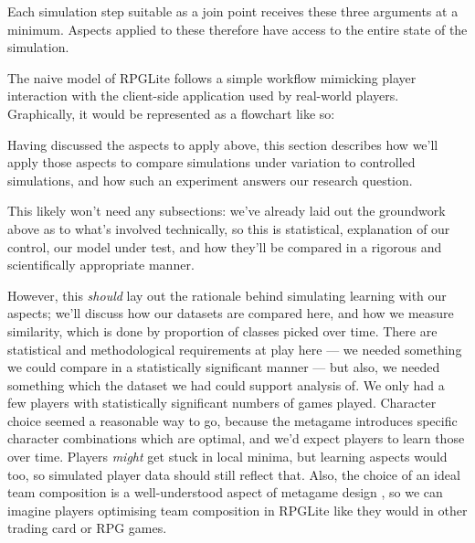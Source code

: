 Each simulation step suitable as a join point receives these three arguments at
a minimum. Aspects applied to these therefore have access to the entire state of
the simulation.

The naive model of RPGLite follows a simple workflow mimicking player
interaction with the client-side application used by real-world players.
Graphically, it would be represented as a flowchart like so:





Having discussed the aspects to apply above, this section describes how we'll
apply those aspects to compare simulations under variation to controlled
simulations, and how such an experiment answers our research question.

This likely won't need any subsections: we've already laid out the groundwork
above as to what's involved technically, so this is statistical, explanation of
our control, our model under test, and how they'll be compared in a rigorous and
scientifically appropriate manner.

However, this \emph{should} lay out the rationale behind simulating learning
with our aspects; we'll discuss how our datasets are compared here, and how we
measure similarity, which is done by proportion of classes picked over time.
There are statistical and methodological requirements at play here --- we needed
something we could compare in a statistically significant manner --- but also,
we needed something which the dataset we had could support analysis of. We only
had a few players with statistically significant numbers of games played.
Character choice seemed a reasonable way to go, because the metagame introduces
specific character combinations which are optimal, and we'd expect players to
learn those over time. Players \emph{might} get stuck in local minima, but
learning aspects would too, so simulated player data should still reflect that.
Also, the choice of an ideal team composition is a well-understood aspect of
metagame design , so we can
imagine players optimising team composition in RPGLite like they would in other
trading card or RPG games.



